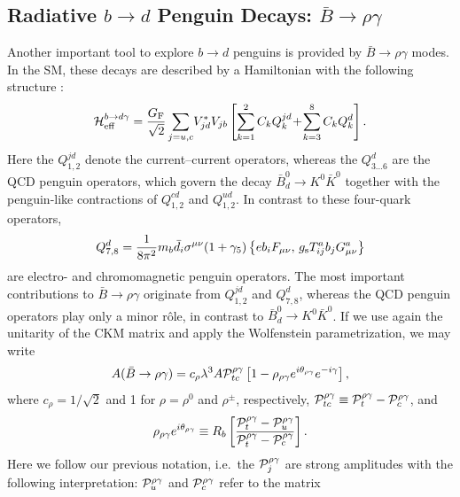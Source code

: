 \documentclass[12pt]{article}
\begin{document}
\subsection{Radiative $b\to d$ Penguin Decays: 
$\bar B\to\rho\gamma$}\label{ssec:radiative}
\unboldmath
%
%
%
Another important tool to explore $b\to d$ penguins is
provided by $\bar B\to\rho\gamma$ modes.  In the SM, these decays 
are described by a Hamiltonian with the following 
structure \cite{B-LH98}:
\begin{equation}\label{Ham-bdgam}
{\cal H}_{\rm eff}^{b\to d\gamma}=\frac{G_{\rm F}}{\sqrt{2}}
\sum_{j=u,c} \! V_{jd}^\ast V_{jb}\left[\sum_{k=1}^{2}C_k Q_k^{jd}\!+\!
\sum_{k=3}^{8}C_k Q_k^{d}\right].
\end{equation}
Here the $Q_{1,2}^{jd}$ denote the current--current operators, whereas the 
$Q_{3\ldots 6}^{d}$ are the QCD penguin operators, which govern the
decay $\bar B^0_d\to  K^0\bar K^0$ together with the
penguin-like contractions of $Q_{1,2}^{cd}$ and $Q_{1,2}^{ud}$. In contrast 
to these four-quark operators,
\begin{equation}
Q_{7,8}^{d}=\frac{1}{8\pi^2}m_b\bar d_i \sigma^{\mu\nu}(1+\gamma_5)
\left\{e b_i F_{\mu\nu} ,\, g_{\rm s}T^a_{ij}b_j G^a_{\mu\nu} \right\}
\end{equation}
are electro- and chromomagnetic penguin operators. 
The most important contributions to $\bar B\to\rho\gamma$
originate from $Q_{1,2}^{jd}$ and $Q_{7,8}^{d}$, 
whereas the QCD penguin operators play only a minor r\^ole, in contrast 
to $\bar B^0_d\to K^0\bar K^0$. If we use again the
unitarity of the CKM matrix and apply the Wolfenstein parametrization,
we may write
\begin{equation}\label{Ampl-Brhogam}
A(\bar B \to \rho\gamma)=c_\rho \lambda^3 A {\cal P}_{tc}^{\rho\gamma}
\left[1-\rho_{\rho\gamma}e^{i\theta_{\rho\gamma}}e^{-i\gamma}\right],
\end{equation}
where $c_\rho=1/\sqrt{2}$ and 1 for $\rho=\rho^0$ and $\rho^\pm$,
respectively, ${\cal P}_{tc}^{\rho\gamma}\equiv
{\cal P}_t^{\rho\gamma}-{\cal P}_c^{\rho\gamma}$, and
\begin{equation}
\rho_{\rho\gamma}e^{i\theta_{\rho\gamma}}\equiv R_b\left[
\frac{{\cal P}_t^{\rho\gamma}-
{\cal P}_u^{\rho\gamma}}{{\cal P}_t^{\rho\gamma}-
{\cal P}_c^{\rho\gamma}}\right].
\end{equation}
Here we follow our previous notation, i.e.\ the ${\cal P}_j^{\rho\gamma}$ 
are strong amplitudes with the following interpretation: 
${\cal P}_u^{\rho\gamma}$ and ${\cal P}_c^{\rho\gamma}$ refer to the matrix 
\end{document}
